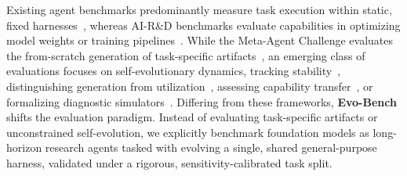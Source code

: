 

Existing agent benchmarks predominantly measure task execution within static, fixed harnesses~\cite{swebench,osworld,taubench,browsecomp,gdpval}, whereas AI-R\&D benchmarks evaluate capabilities in optimizing model weights or training pipelines~\cite{mlagentbench,mlebench,rebench,paperbench,posttrainbench}. While the Meta-Agent Challenge evaluates the from-scratch generation of task-specific artifacts~\cite{mac}, an emerging class of evaluations focuses on self-evolutionary dynamics, tracking stability~\cite{seaeval}, distinguishing generation from utilization~\cite{harnessupdating}, assessing capability transfer~\cite{evoagentbench}, or formalizing diagnostic simulators~\cite{seagym}. 
Differing from these frameworks, \textbf{Evo-Bench} shifts the evaluation paradigm. Instead of evaluating task-specific artifacts or unconstrained self-evolution, we explicitly benchmark foundation models as long-horizon research agents tasked with evolving a single, shared general-purpose harness, validated under a rigorous, sensitivity-calibrated task split.